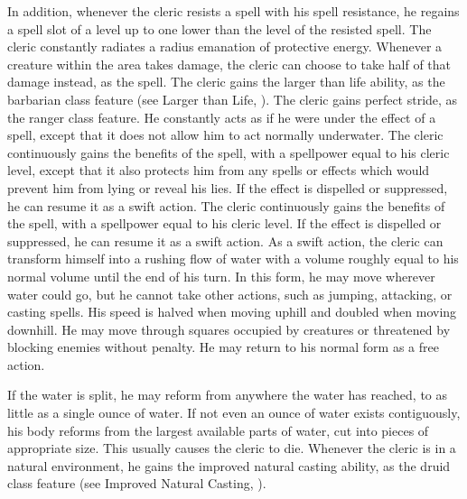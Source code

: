 In addition, whenever the cleric resists a spell with his spell resistance, he regains a spell slot of a level up to one lower than the level of the resisted spell.
The cleric constantly radiates a \areamed radius emanation of protective energy.
Whenever a creature within the area takes damage, the cleric can choose to take half of that damage instead, as the  spell.
The cleric gains the larger than life ability, as the barbarian class feature (see Larger than Life, ).
The cleric gains perfect stride, as the ranger class feature.
He constantly acts as if he were under the effect of a  spell, except that it does not allow him to act normally underwater.
 The cleric continuously gains the benefits of the 
spell, with a spellpower equal to his cleric level, except that it also protects him from any spells or effects which would prevent him from lying or reveal his lies.
If the effect is dispelled or suppressed, he can resume it as a swift action.
 The cleric continuously gains the benefits of the 
spell, with a spellpower equal to his cleric level.
If the effect is dispelled or suppressed, he can resume it as a swift action.
As a swift action, the cleric can transform himself into a rushing flow of water with a volume roughly equal to his normal volume until the end of his turn.
In this form, he may move wherever water could go, but he cannot take other actions, such as jumping, attacking, or casting spells.
His speed is halved when moving uphill and doubled when moving downhill.
He may move through squares occupied by creatures or threatened by blocking enemies without penalty.
He may return to his normal form as a free action.
\par If the water is split, he may reform from anywhere the water has reached, to as little as a single ounce of water.
If not even an ounce of water exists contiguously, his body reforms from the largest available parts of water, cut into pieces of appropriate size.
This usually causes the cleric to die.
Whenever the cleric is in a natural environment, he gains the improved natural casting ability, as the druid class feature (see Improved Natural Casting, ).

